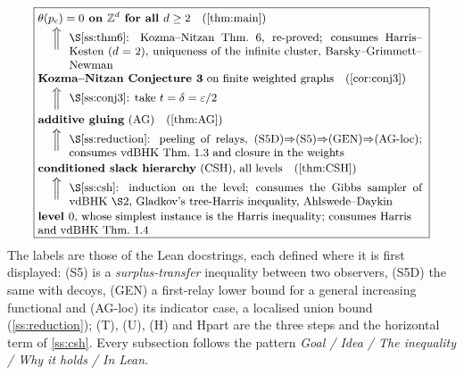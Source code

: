 \documentclass[11pt]{article}
\theoremstyle{definition}
\theoremstyle{remark}
\newcommand{\Zd}{\mathbb{Z}^d}
\newcommand{\pc}{p_{\mathrm c}}
\begin{document}
\begin{equation}\label{eq:chain}
\fbox{\parbox{0.9\textwidth}{\small\raggedright
 \textbf{$\theta(\pc)=0$ on $\Zd$ for all $d\ge2$}\quad(\cref{thm:main})\\[1pt]
 \hspace*{1.2em}$\Big\Uparrow$\ \ \parbox[t]{0.82\textwidth}{\S\ref{ss:thm6}: Kozma--Nitzan Thm.~6, re-proved; consumes Harris--Kesten ($d=2$), uniqueness of the infinite cluster, Barsky--Grimmett--Newman}\\[3pt]
 \textbf{Kozma--Nitzan Conjecture~3} on finite weighted graphs\quad(\cref{cor:conj3})\\[1pt]
 \hspace*{1.2em}$\Big\Uparrow$\ \ \parbox[t]{0.82\textwidth}{\S\ref{ss:conj3}: take $t=\delta=\varepsilon/2$}\\[3pt]
 \textbf{additive gluing} (AG)\quad(\cref{thm:AG})\\[1pt]
 \hspace*{1.2em}$\Big\Uparrow$\ \ \parbox[t]{0.82\textwidth}{\S\ref{ss:reduction}: peeling of relays, (S5D)$\Rightarrow$(S5)$\Rightarrow$(GEN)$\Rightarrow$(AG-loc); consumes vdBHK Thm.~1.3 and closure in the weights}\\[3pt]
 \textbf{conditioned slack hierarchy} (CSH), all levels\quad(\cref{thm:CSH})\\[1pt]
 \hspace*{1.2em}$\Big\Uparrow$\ \ \parbox[t]{0.82\textwidth}{\S\ref{ss:csh}: induction on the level; consumes the Gibbs sampler of vdBHK \S2, Gladkov's tree-Harris inequality, Ahlswede--Daykin}\\[3pt]
 \textbf{level $0$}, whose simplest instance is the Harris inequality; consumes Harris and vdBHK Thm.~1.4}}
\end{equation}
The labels are those of the Lean docstrings, each defined where it is first displayed: (S5) is a \emph{surplus-transfer} inequality between two
observers, (S5D) the same with decoys, (GEN) a first-relay lower bound for a general increasing functional and (AG-loc) its indicator case, a
localised union bound (\cref{ss:reduction}); (T), (U), (H) and Hpart are the three steps and the horizontal term of \cref{ss:csh}.  Every
subsection follows the pattern \emph{Goal / Idea / The inequality / Why it holds / In Lean}.

\end{document}
